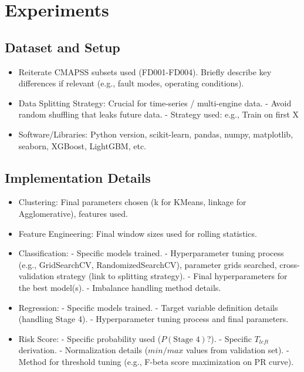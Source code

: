 \section{Experiments}
\label{sec:experiments}

\subsection{Dataset and Setup}
\begin{itemize}
    \item Reiterate CMAPSS subsets used (FD001-FD004). Briefly describe key differences if relevant (e.g., fault modes, operating conditions).
    \item Data Splitting Strategy: Crucial for time-series / multi-engine data.
        - Avoid random shuffling that leaks future data.
        - Strategy used: e.g., Train on first X%
    \item Software/Libraries: Python version, scikit-learn, pandas, numpy, matplotlib, seaborn, XGBoost, LightGBM, etc.
\end{itemize}

\subsection{Implementation Details}
\begin{itemize}
    \item Clustering: Final parameters chosen (k for KMeans, linkage for Agglomerative), features used.
    \item Feature Engineering: Final window sizes used for rolling statistics.
    \item Classification:
        - Specific models trained.
        - Hyperparameter tuning process (e.g., GridSearchCV, RandomizedSearchCV), parameter grids searched, cross-validation strategy (link to splitting strategy).
        - Final hyperparameters for the best model(s).
        - Imbalance handling method details.
    \item Regression:
        - Specific models trained.
        - Target variable definition details (handling Stage 4).
        - Hyperparameter tuning process and final parameters.
    \item Risk Score:
        - Specific probability used ($P(\text{Stage 4})$?).
        - Specific $T_{left}$ derivation.
        - Normalization details ($min/max$ values from validation set).
        - Method for threshold tuning (e.g., F-beta score maximization on PR curve).
\end{itemize}

